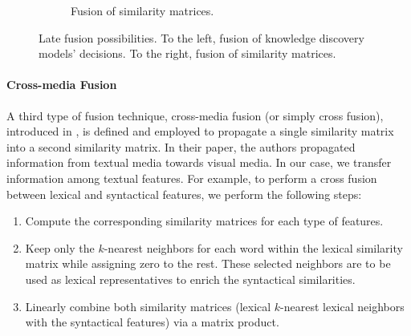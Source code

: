 \begin{figure}
\begin{subfigure}[t]{.5\textwidth}
	\caption{Fusion of similarity matrices.}
	\label{fig:lf2}	
	\end{subfigure}
	\caption{Late fusion possibilities. To the left, fusion of knowledge discovery models' decisions. To the right, fusion of similarity matrices.}
	\label{fig:lf_diag}
\end{figure}




\paragraph{Cross-media  Fusion}
%
A third type of fusion technique, cross-media  fusion (or simply cross fusion),   introduced in \cite{ClinchantAC11,Ah-PineCC15}, is defined and employed to propagate a single similarity matrix into a second similarity matrix. In their paper, the authors propagated information from textual media towards visual media. In our case, we transfer information among textual features. For example, to perform a cross fusion between lexical and syntactical features, we perform the following steps: 
\begin{enumerate}
\item Compute the corresponding similarity matrices for each type of features.
\item Keep only the $k$-nearest neighbors for each word within the lexical similarity matrix while assigning zero to the rest.  These selected neighbors are to be used as lexical representatives to enrich the syntactical similarities.
\item Linearly combine both similarity matrices (lexical $k$-nearest lexical neighbors with the syntactical features) via a matrix product.
\end{enumerate}  

